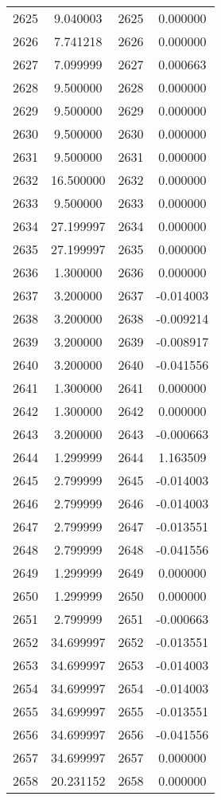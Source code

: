 \documentclass[12pt]{article}
\begin{document}
\begin{longtable}{@{}cccc@{}}
2625 & 9.040003 & 2625 & 0.000000 \\
2626 & 7.741218 & 2626 & 0.000000 \\
2627 & 7.099999 & 2627 & 0.000663 \\
2628 & 9.500000 & 2628 & 0.000000 \\
2629 & 9.500000 & 2629 & 0.000000 \\
2630 & 9.500000 & 2630 & 0.000000 \\
2631 & 9.500000 & 2631 & 0.000000 \\
2632 & 16.500000 & 2632 & 0.000000 \\
2633 & 9.500000 & 2633 & 0.000000 \\
2634 & 27.199997 & 2634 & 0.000000 \\
2635 & 27.199997 & 2635 & 0.000000 \\
2636 & 1.300000 & 2636 & 0.000000 \\
2637 & 3.200000 & 2637 & -0.014003 \\
2638 & 3.200000 & 2638 & -0.009214 \\
2639 & 3.200000 & 2639 & -0.008917 \\
2640 & 3.200000 & 2640 & -0.041556 \\
2641 & 1.300000 & 2641 & 0.000000 \\
2642 & 1.300000 & 2642 & 0.000000 \\
2643 & 3.200000 & 2643 & -0.000663 \\
2644 & 1.299999 & 2644 & 1.163509 \\
2645 & 2.799999 & 2645 & -0.014003 \\
2646 & 2.799999 & 2646 & -0.014003 \\
2647 & 2.799999 & 2647 & -0.013551 \\
2648 & 2.799999 & 2648 & -0.041556 \\
2649 & 1.299999 & 2649 & 0.000000 \\
2650 & 1.299999 & 2650 & 0.000000 \\
2651 & 2.799999 & 2651 & -0.000663 \\
2652 & 34.699997 & 2652 & -0.013551 \\
2653 & 34.699997 & 2653 & -0.014003 \\
2654 & 34.699997 & 2654 & -0.014003 \\
2655 & 34.699997 & 2655 & -0.013551 \\
2656 & 34.699997 & 2656 & -0.041556 \\
2657 & 34.699997 & 2657 & 0.000000 \\
2658 & 20.231152 & 2658 & 0.000000 \\

\end{longtable}
\end{document}
